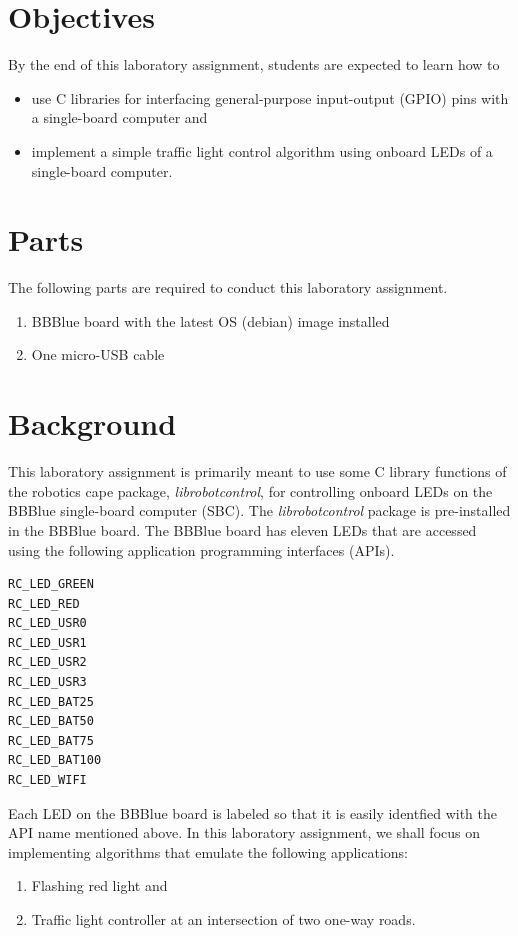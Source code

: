 \section{Objectives}
By the end of this laboratory assignment, students are expected to learn how to 

\begin{itemize}

\item use C libraries for interfacing general-purpose input-output (GPIO) pins with a single-board computer and   
  
\item implement a simple traffic light control algorithm using onboard LEDs of a single-board computer.  
 
  
\end{itemize}

\section{Parts}
\label{sec:partsTLC}
The following parts are required to conduct this laboratory assignment. %
%
\begin{enumerate}
\item BBBlue board with the latest OS (debian) image installed
\item One micro-USB cable  
\end{enumerate}

\section{Background}
\label{sec:background}

This laboratory assignment is primarily meant to use some C library functions of the robotics cape package, \emph{librobotcontrol}, for controlling onboard LEDs on the BBBlue single-board computer (SBC).  The \emph{librobotcontrol} package is pre-installed in the BBBlue board. The BBBlue board has eleven LEDs that are accessed using the following application programming interfaces (APIs).
\begin{center}
\begin{verbatim}
RC_LED_GREEN 	
RC_LED_RED 	
RC_LED_USR0 	
RC_LED_USR1 	
RC_LED_USR2 	
RC_LED_USR3 	
RC_LED_BAT25 	
RC_LED_BAT50 	
RC_LED_BAT75 	
RC_LED_BAT100 	
RC_LED_WIFI 
\end{verbatim}  
\end{center}
%
Each LED on the BBBlue board is labeled so that it is easily identfied with the API name mentioned above. In this laboratory assignment, we shall focus on implementing  algorithms that emulate the following applications:
%
\begin{enumerate}
    \item Flashing red light and 
    \item Traffic light controller at an intersection of two one-way roads.
\end{enumerate}
%

